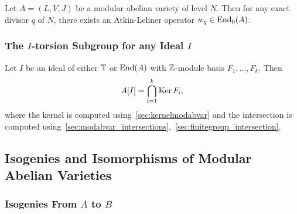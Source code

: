 \documentclass{article}
\begin{document}
Let $A=(L, V, J)$ be a modular abelian variety of level $N$. Then for any exact
divisor $q$ of $N$, there exists an Atkin-Lehner operator $w_q\in \operatorname{End}_0(A)$.


\subsubsection{The $I$-torsion Subgroup for any Ideal $I$}

Let $I$ be an ideal of either $\mathbb{T}$ or $\operatorname{End}(A)$ with $\mathbb{Z}$-module basis
$F_1,\ldots,F_k$. Then
\[
    A[I] = \bigcap_{i=1} ^k \operatorname{Ker} F_i,
\]
where the kernel is computed using~\ref{sec:kernelmodabvar} and the
intersection is computed
using~\ref{sec:modabvar_intersections},~\ref{sec:finitegroup_intersection}.

\subsection{Isogenies and Isomorphisms of Modular Abelian Varieties}

\subsubsection{Isogenies From $A$ to $B$}
\end{document}
